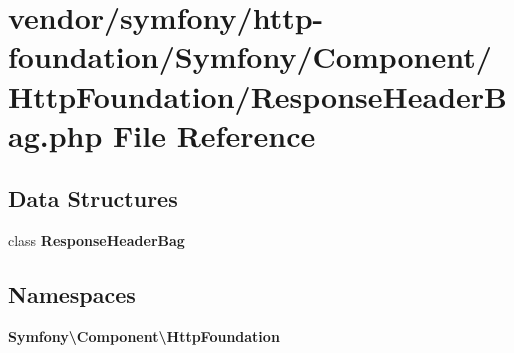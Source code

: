 \section{vendor/symfony/http-\/foundation/\+Symfony/\+Component/\+Http\+Foundation/\+Response\+Header\+Bag.php File Reference}
\label{_response_header_bag_8php}
\subsection*{Data Structures}
\begin{DoxyCompactItemize}
\item 
class {\bf Response\+Header\+Bag}
\end{DoxyCompactItemize}
\subsection*{Namespaces}
\begin{DoxyCompactItemize}
\item 
 {\bf Symfony\textbackslash{}\+Component\textbackslash{}\+Http\+Foundation}
\end{DoxyCompactItemize}
